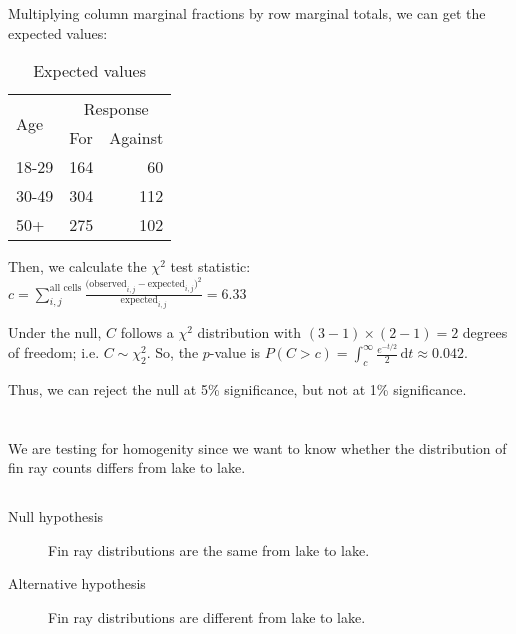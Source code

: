 \documentclass[twocolumn]{article}
\newcommand{\setsection}[1]{\setcounter{section}{#1}\addtocounter{section}{-1}\section{}}
\newcommand{\intg}[4]{\int_{#1}^{#2} \! #3 \, \mathrm{d}#4}
\begin{document}
Multiplying column marginal fractions by row marginal totals, we can get the expected values:

\begin{table}[!ht]
\centering
\begin{tabular}{@{}lrr@{}}
\toprule
\multirow{2}{*}{Age} & \multicolumn{2}{c}{Response}                          \\ \cmidrule(l){2-3} 
                     & \multicolumn{1}{l}{For} & \multicolumn{1}{l}{Against} \\ \midrule
18-29                & 164                     & 60                          \\
30-49                & 304                     & 112                         \\
50+                  & 275                     & 102                         \\ \bottomrule
\end{tabular}
\caption{Expected values}
\end{table}

Then, we calculate the $\chi^2$ test statistic:\\
$c=\sum_{i,j}^\text{all cells}\frac{\text{(observed}_{i,j}-\text{expected}_{i,j})^2}{\text{expected}_{i,j}}=6.33$

Under the null, $C$ follows a $\chi^2$ distribution with $(3-1)\times(2-1)=2$ degrees of freedom; i.e. $C\sim\chi^2_2$. So, the $p$-value is $P(C>c)=\intg{c}{\infty}{\frac{e^{-t/2}}{2}}{t}\approx0.042$.

Thus, we can reject the null at 5\% significance, but not at 1\% significance.

\setsection{13}

\subsection{} We are testing for homogenity since we want to know whether the distribution of fin ray counts differs from lake to lake.

\subsection{}
\begin{description}
\item[Null hypothesis] Fin ray distributions are the same from lake to lake.
\item[Alternative hypothesis] Fin ray distributions are different from lake to lake.
\end{description}
\end{document}
